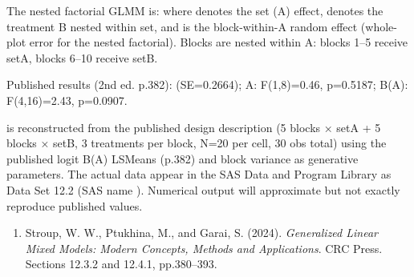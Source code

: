\documentclass[a4paper]{book}
\begin{document}
%
\begin{Details}
The nested factorial GLMM is:
where  denotes the set (A) effect, 
denotes the treatment B nested within set, and
 is the block-within-A
random effect (whole-plot error for the nested factorial).  Blocks are
nested within A: blocks 1–5 receive setA, blocks 6–10 receive setB.

Published results (2nd ed. p.382):
 (SE=0.2664);
A: F(1,8)=0.46, p=0.5187; B(A): F(4,16)=2.43, p=0.0907.
\end{Details}
%
\begin{Note}
  is reconstructed from the
published design description (5 blocks × setA + 5 blocks × setB, 3
treatments per block, N=20 per cell, 30 obs total) using the published
logit B(A) LSMeans (p.382) and block variance 
as generative parameters.  The actual data appear in the SAS Data and
Program Library as Data Set 12.2 (SAS name ).
Numerical output will approximate but not exactly reproduce published
values.
\end{Note}
%
\begin{References}
\begin{enumerate}

\item{} Stroup, W. W., Ptukhina, M., and Garai, S. (2024).
\emph{Generalized Linear Mixed Models: Modern Concepts, Methods and
Applications}. CRC Press. Sections 12.3.2 and 12.4.1, pp.380–393.

\end{enumerate}

\end{References}
%
\begin{SeeAlso}
\end{SeeAlso}
%
\end{document}
